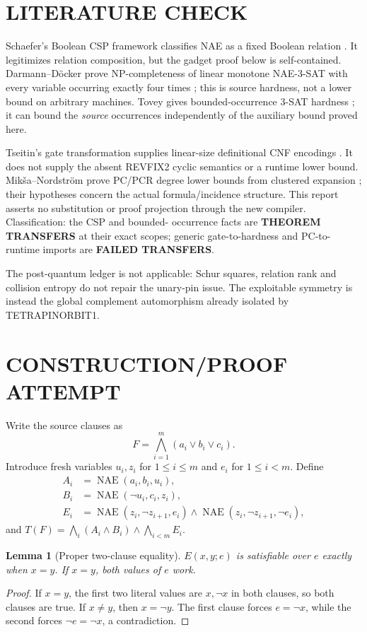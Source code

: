 \documentclass[11pt]{article}
\newtheorem{lemma}[theorem]{Lemma}
\begin{document}
\section{LITERATURE CHECK}
Schaefer's Boolean CSP framework classifies NAE as a fixed Boolean relation
\cite{Schaefer78}.  It legitimizes relation composition, but the gadget proof
below is self-contained.  Darmann--D\"ocker prove NP-completeness of linear
monotone NAE-3-SAT with every variable occurring exactly four times
\cite{DD20}; this is source hardness, not a lower bound on arbitrary machines.
Tovey gives bounded-occurrence 3-SAT hardness \cite{Tovey84}; it can bound the
\emph{source} occurrences independently of the auxiliary bound proved here.

Tseitin's gate transformation supplies linear-size definitional CNF encodings
\cite{Tseitin70}.  It does not supply the absent REVFIX2 cyclic semantics or a
runtime lower bound.  Mik\v{s}a--Nordstr\"om prove PC/PCR degree lower bounds
from clustered expansion \cite{MN15}; their hypotheses concern the actual
formula/incidence structure.  This report asserts no substitution or proof
projection through the new compiler.  Classification: the CSP and bounded-
occurrence facts are \textbf{THEOREM TRANSFERS} at their exact scopes; generic
gate-to-hardness and PC-to-runtime imports are \textbf{FAILED TRANSFERS}.

The post-quantum ledger is not applicable: Schur squares, relation rank and
collision entropy do not repair the unary-pin issue.  The exploitable symmetry
is instead the global complement automorphism already isolated by
TETRAPINORBIT1.

\section{CONSTRUCTION/PROOF ATTEMPT}
Write the source clauses as
\[F=\bigwedge_{i=1}^m(a_i\vee b_i\vee c_i).
\]
Introduce fresh variables $u_i,z_i$ for $1\le i\le m$ and $e_i$ for
$1\le i<m$.  Define
\begin{align*}
A_i&=\operatorname{NAE}(a_i,b_i,u_i),\\
B_i&=\operatorname{NAE}(\neg u_i,c_i,z_i),\\
E_i&=\operatorname{NAE}(z_i,\neg z_{i+1},e_i)\wedge
\operatorname{NAE}(z_i,\neg z_{i+1},\neg e_i),
\end{align*}
and $T(F)=\bigwedge_i(A_i\wedge B_i)\wedge\bigwedge_{i<m}E_i$.

\begin{lemma}[Proper two-clause equality]
$E(x,y;e)$ is satisfiable over $e$ exactly when $x=y$.  If $x=y$, both values
of $e$ work.
\end{lemma}
\begin{proof}
If $x=y$, the first two literal values are $x,\neg x$ in both clauses, so both
clauses are true.  If $x\ne y$, then $x=\neg y$.  The first clause forces
$e=\neg x$, while the second forces $\neg e=\neg x$, a contradiction.
\end{proof}
\end{document}
